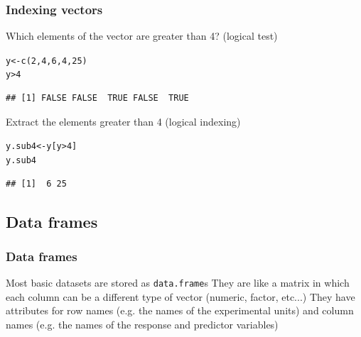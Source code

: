 \documentclass[color=usenames,dvipsnames]{beamer}\usepackage[]{graphicx}\usepackage[]{color}
\makeatletter
\newcommand{\hlnum}[1]{\textcolor[rgb]{0.69,0.494,0}{#1}}%
\newcommand{\hlopt}[1]{\textcolor[rgb]{0,0,0}{#1}}%
\newcommand{\hlstd}[1]{\textcolor[rgb]{0,0,0}{#1}}%
\newcommand{\hlkwb}[1]{\textcolor[rgb]{0,0.341,0.682}{#1}}%
\newcommand{\hlkwd}[1]{\textcolor[rgb]{0.004,0.004,0.506}{#1}}%
\newenvironment{kframe}{%
 \def\at@end@of@kframe{}%
 \ifinner\ifhmode%
  \def\at@end@of@kframe{\end{minipage}}%
  \begin{minipage}{\columnwidth}%
 \fi\fi%
 \def\FrameCommand##1{\hskip\@totalleftmargin \hskip-\fboxsep
 \colorbox{shadecolor}{##1}\hskip-\fboxsep
     \hskip-\linewidth \hskip-\@totalleftmargin \hskip\columnwidth}%
 \MakeFramed {\advance\hsize-\width
   \@totalleftmargin\z@ \linewidth\hsize
   \@setminipage}}%
 {\par\unskip\endMakeFramed%
 \at@end@of@kframe}
\newenvironment{knitrout}{}{} %
\makeatother
\begin{document}
\begin{frame}[fragile]
  \frametitle{Indexing vectors}
  \small
  Which elements of the vector are greater than 4? (logical test)
\begin{knitrout}\small
{}\color{fgcolor}\begin{kframe}
\begin{alltt}
\hlstd{y} \hlkwb{<-} \hlkwd{c}\hlstd{(}\hlnum{2}\hlstd{,} \hlnum{4}\hlstd{,} \hlnum{6}\hlstd{,} \hlnum{4}\hlstd{,} \hlnum{25}\hlstd{)}
\hlstd{y}\hlopt{>}\hlnum{4}
\end{alltt}
\begin{verbatim}
## [1] FALSE FALSE  TRUE FALSE  TRUE
\end{verbatim}
\end{kframe}
\end{knitrout}
\pause \vfill
  Extract the elements greater than 4 (logical indexing)
\begin{knitrout}\small
{}\color{fgcolor}\begin{kframe}
\begin{alltt}
\hlstd{y.sub4} \hlkwb{<-} \hlstd{y[y}\hlopt{>}\hlnum{4}\hlstd{]}
\hlstd{y.sub4}
\end{alltt}
\begin{verbatim}
## [1]  6 25
\end{verbatim}
\end{kframe}
\end{knitrout}
\end{frame}


\subsection{Data frames}


\begin{frame}[fragile]
  \frametitle{Data frames}
  \large
  Most basic datasets are stored as \verb+data.frame+s
  \pause \vfill
  They are like a matrix in which each column can be a
      different type of vector (numeric, factor, etc...)
  \pause \vfill
   They have attributes for row names (e.g. the names of
      the experimental units) and column names (e.g. the names of
      the response and predictor variables)
\end{frame}
\end{document}
